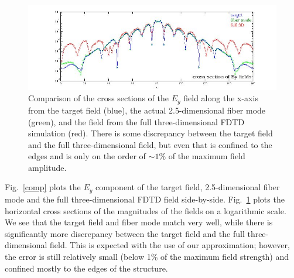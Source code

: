\begin{figure}[hbt]
\centering\includegraphics[width=\textwidth]{p2/the_xsec}
\caption{Comparison of the cross sections of the $E_y$ field along the x-axis from the target field (blue), the actual 2.5-dimensional fiber mode (green), and the field from the full three-dimensional FDTD simulation (red). There is some discrepancy between the target field and the full three-dimensional field, but even that is confined to the edges and is only on the order of $\sim 1\%$ of the maximum field amplitude.}\label{xsec}
\end{figure}
Fig.~\ref{comp} plots the $E_y$ component of the target field, 2.5-dimensional fiber mode and the full three-dimensional FDTD field side-by-side. Fig.~\ref{xsec} plots the horizontal cross sections of the magnitudes of the fields on a logarithmic scale. We see that the target field and fiber mode match very well, while there is significantly more discrepancy between the target field and the full three-dimensional field. This is expected with the use of our approximation; however, the error is still relatively small (below 1\% of the maximum field strength) and confined mostly to the edges of the structure.
% 
% 
